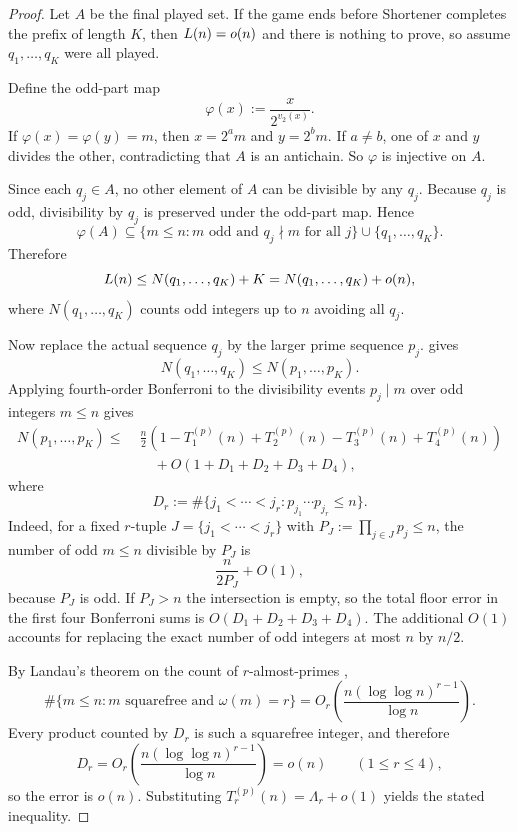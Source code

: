 \begin{proof}
Let $A$ be the final played set.  If the game ends before Shortener completes
the prefix of length $K$, then $L(n)=o(n)$ and there is nothing to prove, so
assume $q_1,\dots,q_K$ were all played.

Define the odd-part map
\[
  \varphi(x) := \frac{x}{2^{v_2(x)}}.
\]
If $\varphi(x)=\varphi(y)=m$, then $x=2^a m$ and $y=2^b m$.  If $a\neq b$, one
of $x$ and $y$ divides the other, contradicting that $A$ is an antichain.  So
$\varphi$ is injective on $A$.

Since each $q_j\in A$, no other element of $A$ can be divisible by any $q_j$.
Because $q_j$ is odd, divisibility by $q_j$ is preserved under the odd-part
map.  Hence
\[
  \varphi(A)
  \subseteq
  \{m\le n : m \text{ odd and } q_j\nmid m \text{ for all } j\}
  \cup \{q_1,\dots,q_K\}.
\]
Therefore
\[
  L(n) \le N(q_1,\dots,q_K) + K = N(q_1,\dots,q_K)+o(n),
\]
where $N(q_1,\dots,q_K)$ counts odd integers up to $n$ avoiding all $q_j$.

Now replace the actual sequence $q_j$ by the larger prime sequence $p_j$.
 gives
\[
  N(q_1,\dots,q_K) \le N(p_1,\dots,p_K).
\]
Applying fourth-order Bonferroni to the divisibility events $p_j \mid m$ over
odd integers $m\le n$ gives
\[
\begin{aligned}
  N(p_1,\dots,p_K)
  \le\;&
  \frac n2
  \left(1-T_1^{(p)}(n)+T_2^{(p)}(n)-T_3^{(p)}(n)+T_4^{(p)}(n)\right) \\
  &\quad + O(1+D_1+D_2+D_3+D_4),
\end{aligned}
\]
where
\[
  D_r:=
  \#\{j_1<\cdots<j_r:p_{j_1}\cdots p_{j_r}\le n\}.
\]
Indeed, for a fixed $r$-tuple $J=\{j_1<\cdots<j_r\}$ with
$P_J:=\prod_{j\in J}p_j\le n$, the number of odd $m\le n$ divisible by
$P_J$ is
\[
  \frac{n}{2P_J}+O(1),
\]
because $P_J$ is odd.  If $P_J>n$ the intersection is empty, so the total
floor error in the first four Bonferroni sums is
$O(D_1+D_2+D_3+D_4)$.  The additional $O(1)$ accounts for replacing the exact
number of odd integers at most $n$ by $n/2$.

By Landau's theorem on the count of $r$-almost-primes
\cite[Theorem~437]{HardyWright08},
\[
  \#\{m\le n:m\text{ squarefree and }\omega(m)=r\}
  =
  O_r\!\left(\frac{n(\log\log n)^{r-1}}{\log n}\right).
\]
Every product counted by $D_r$ is such a squarefree integer, and therefore
\[
  D_r
  =
  O_r\!\left(\frac{n(\log\log n)^{r-1}}{\log n}\right)
  =
  o(n)
  \qquad (1\le r\le4),
\]
so the error is $o(n)$.  Substituting $T_r^{(p)}(n)=\Lambda_r+o(1)$ yields the
stated inequality.
\end{proof}

